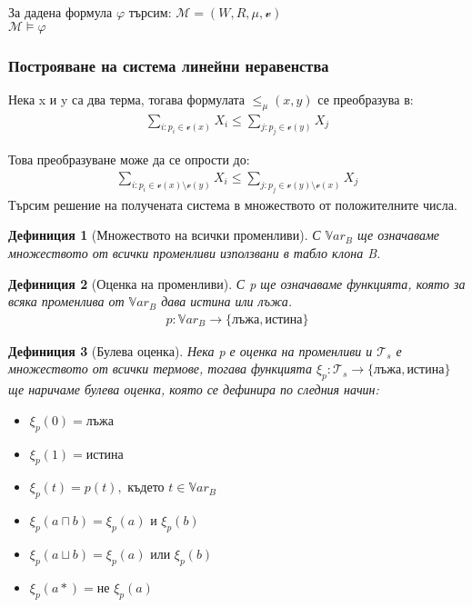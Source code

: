 \documentclass{beamer}
\newtheorem{defn}{Дефиниция}[section]
\newcommand{\Var}{\mathbb{V}ar}
\newcommand{\vE}{\mathscr{v}}
\newcommand{\vBool}{\xi}
\newcommand{\Ts}{\mathcal{T}_s}
\begin{document}
\begin{frame}
	\begin{center}
	За дадена формула $\varphi$ търсим: $\mathcal{M} = (W, R, \mu, \mathscr{v})$ \\
	$ \mathcal{M} \models \varphi$
	\end{center}
\end{frame}

\begin{frame}\frametitle{Построяване на система линейни неравенства}
	Нека x и y са два терма, тогава формулата $\le_\mu(x, y)$ се преобразува в:
	\begin{align*}
		\sum_{i: p_i \in \vE(x)} X_i \leq \sum_{j: p_j \in \vE(y)} X_j
	\end{align*}

			Това преобразуване може да се опрости до:
			\begin{align*}
				\sum_{i: p_i \in \vE(x) \setminus \vE(y)} X_i \leq \sum_{j: p_j \in \vE(y) \setminus \vE(x)} X_j
			\end{align*}
    	Търсим решение на получената система в множеството от положителните числа.
\end{frame}

\begin{frame}
\begin{defn}[Множеството на всички променливи]
	С $\Var_B$ ще означаваме множеството от всички променливи използвани в табло клона B.
\end{defn}

\begin{defn}[Оценка на променливи]
	С p ще означаваме функцията, която за всяка променлива от $\Var_B$ дава истина или лъжа.
		\begin{align*}
			p : \Var_B \rightarrow \{ \textbf{лъжа}, \textbf{истина}\}
		\end{align*}
\end{defn}
\end{frame}

\begin{frame}
\begin{defn}[Булева оценка]
		Нека p е оценка на променливи и $\Ts$ е множеството от всички термове, тогава 
		функцията $\vBool_p : \Ts \rightarrow \{ \textbf{лъжа}, \textbf{истина}\}$ ще наричаме булева оценка, която се дефинира по следния начин:
		\begin{itemize}
			\item $\vBool_p(0) = \textbf{лъжа}$
			\item $\vBool_p(1) = \textbf{истина}$
			\item $\vBool_p(t) =p(t), \textit{ където } t \in \Var_B$
			\item $\vBool_p(a \sqcap b) = \vBool_p(a) \textit{ и } \vBool_p(b)$
			\item $\vBool_p(a \sqcup b) = \vBool_p(a) \textit{ или } \vBool_p(b)$
			\item $\vBool_p(a*) = \textit{не } \vBool_p(a)$
		\end{itemize}
\end{defn}
\end{frame}
\end{document}
